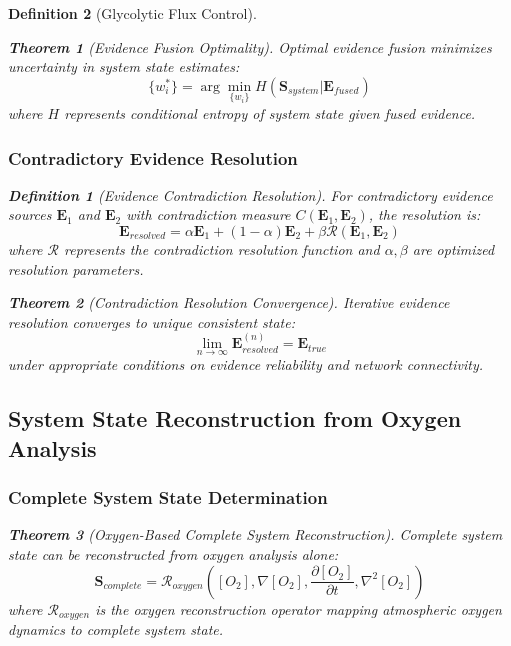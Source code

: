 \documentclass[12pt,a4paper]{article}
\newtheorem{theorem}{Theorem}
\newtheorem{definition}{Definition}
\begin{document}
\begin{definition}[Glycolytic Flux Control]
\begin{theorem}[Evidence Fusion Optimality]
Optimal evidence fusion minimizes uncertainty in system state estimates:
\begin{equation}
\{w_i^*\} = \arg\min_{\{w_i\}} H(\mathbf{S}_{system} | \mathbf{E}_{fused})
\end{equation}
where $H$ represents conditional entropy of system state given fused evidence.
\end{theorem}

\subsubsection{Contradictory Evidence Resolution}

\begin{definition}[Evidence Contradiction Resolution]
For contradictory evidence sources $\mathbf{E}_1$ and $\mathbf{E}_2$ with contradiction measure $C(\mathbf{E}_1, \mathbf{E}_2)$, the resolution is:
\begin{equation}
\mathbf{E}_{resolved} = \alpha \mathbf{E}_1 + (1-\alpha) \mathbf{E}_2 + \beta \mathcal{R}(\mathbf{E}_1, \mathbf{E}_2)
\end{equation}
where $\mathcal{R}$ represents the contradiction resolution function and $\alpha, \beta$ are optimized resolution parameters.
\end{definition}

\begin{theorem}[Contradiction Resolution Convergence]
Iterative evidence resolution converges to unique consistent state:
\begin{equation}
\lim_{n \to \infty} \mathbf{E}_{resolved}^{(n)} = \mathbf{E}_{true}
\end{equation}
under appropriate conditions on evidence reliability and network connectivity.
\end{theorem}

\subsection{System State Reconstruction from Oxygen Analysis}

\subsubsection{Complete System State Determination}

\begin{theorem}[Oxygen-Based Complete System Reconstruction]
Complete system state can be reconstructed from oxygen analysis alone:
\begin{equation}
\mathbf{S}_{complete} = \mathcal{R}_{oxygen}([O_2], \nabla [O_2], \frac{\partial [O_2]}{\partial t}, \nabla^2 [O_2])
\end{equation}
where $\mathcal{R}_{oxygen}$ is the oxygen reconstruction operator mapping atmospheric oxygen dynamics to complete system state.
\end{theorem}


\end{definition}
\end{document}
